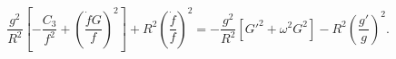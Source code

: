 \begin{equation}
\frac{g^2}{R^2}\left[ - \frac{C_3}{f^2} + \left( \frac{\dot{f}G}{f}
\right)^2 \right] + R^2\left(\frac{\dot{f}}{f}\right)^2 =  
- \frac{g^2}{R^2}[G'^2 + \omega^2G^2 ] - R^2\left(\frac{g'}{g}\right)^2.
\label{ss}\end{equation}

